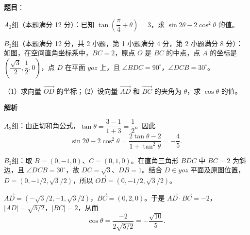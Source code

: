 \begin{answer}

\textbf{题目}：

$A_2$组（本题满分 12 分）：已知 $\tan\left(\dfrac\pi4+\theta\right)=3$，求 $\sin2\theta-2\cos^2\theta$ 的值。

$B_2$组（本题满分 12 分，共 2 小题，第 1 小题满分 4 分，第 2 小题满分 8 分）：如图，在空间直角坐标系中，$BC=2$，原点 $O$ 是 $BC$ 的中点，点 $A$ 的坐标是 $\left(\dfrac{\sqrt3}{2},\dfrac12,0\right)$，点 $D$ 在平面 $yoz$ 上，且 $\angle BDC=90^\circ$，$\angle DCB=30^\circ$。
\nopagebreak[4]
\begin{center}\end{center}
\nopagebreak[4]
（1）求向量 $\overrightarrow{OD}$ 的坐标；（2）设向量 $\overrightarrow{AD}$ 和 $\overrightarrow{BC}$ 的夹角为 $\theta$，求 $\cos\theta$ 的值。

\textbf{解析}

$A_2$组：由正切和角公式，$\tan\theta=\dfrac{3-1}{1+3}=\dfrac12$。因此
\nopagebreak[4]
\[
\sin2\theta-2\cos^2\theta=\frac{2\tan\theta-2}{1+\tan^2\theta}=-\frac45.
\]

$B_2$组：取 $B=(0,-1,0)$、$C=(0,1,0)$。在直角三角形 $BDC$ 中 $BC=2$ 为斜边，且 $\angle DCB=30^\circ$，故 $DC=\sqrt3$、$DB=1$。结合 $D\in yoz$ 平面及原图位置，$D=(0,-1/2,\sqrt3/2)$，所以 $\overrightarrow{OD}=(0,-1/2,\sqrt3/2)$。

$\overrightarrow{AD}=(-\sqrt3/2,-1,\sqrt3/2)$，$\overrightarrow{BC}=(0,2,0)$。于是 $\overrightarrow{AD}\cdot\overrightarrow{BC}=-2$，$|AD|=\sqrt{5/2}$，$|BC|=2$，从而
\nopagebreak[4]
\[
\cos\theta=\frac{-2}{2\sqrt{5/2}}=-\frac{\sqrt{10}}5.
\]


\end{answer}

